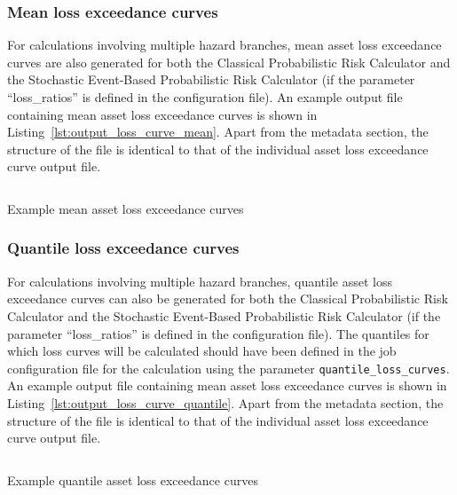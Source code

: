\subsubsection{Mean loss exceedance curves}
\label{subsubsec:mean_loss_curves}

For calculations involving multiple hazard branches, mean asset loss
exceedance curves are also generated for both the Classical Probabilistic Risk
Calculator and the Stochastic Event-Based Probabilistic Risk Calculator (if
the parameter ``loss\_ratios'' is defined in the configuration file). An
example output file containing mean asset loss exceedance curves is shown
in Listing~\ref{lst:output_loss_curve_mean}. Apart from the metadata section, the structure of the file is identical
to that of the individual asset loss exceedance curve output file.

\begin{listing}[htbp]
  \inputminted[firstline=1,firstnumber=1,fontsize=\footnotesize,frame=single,bgcolor=lightgray]{xml}{oqum/risk/verbatim/output_loss_curve_mean.xml}
  \caption{Example mean asset loss exceedance curves}
  \label{lst:output_loss_curve_mean}
\end{listing}

\subsubsection{Quantile loss exceedance curves}
\label{subsubsec:quantile_loss_curves}

For calculations involving multiple hazard branches, quantile asset loss
exceedance curves can also be generated for both the Classical Probabilistic
Risk Calculator and the Stochastic Event-Based Probabilistic Risk Calculator
(if the parameter ``loss\_ratios'' is defined in the configuration file). The
quantiles for which loss curves will be calculated should have been defined in
the job configuration file for the calculation using the parameter
\Verb+quantile_loss_curves+. An example output file containing mean asset loss
exceedance curves is shown in Listing~\ref{lst:output_loss_curve_quantile}. Apart from the metadata section, the
structure of the file is identical to that of the individual asset loss
exceedance curve output file.

\begin{listing}[htbp]
  \inputminted[firstline=1,firstnumber=1,fontsize=\footnotesize,frame=single,bgcolor=lightgray]{xml}{oqum/risk/verbatim/output_loss_curve_quantile.xml}
  \caption{Example quantile asset loss exceedance curves}
  \label{lst:output_loss_curve_quantile}
\end{listing}

